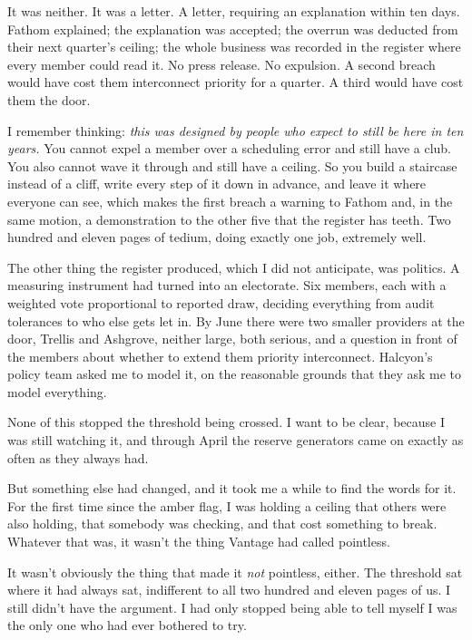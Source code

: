 \documentclass[11pt]{article}
\begin{document}
It was neither. It was a letter. A letter, requiring an explanation within ten days. Fathom explained; the explanation was accepted; the overrun was deducted from their next quarter's ceiling; the whole business was recorded in the register where every member could read it. No press release. No expulsion. A second breach would have cost them interconnect priority for a quarter. A third would have cost them the door.

I remember thinking: \emph{this was designed by people who expect to still be here in ten years.} You cannot expel a member over a scheduling error and still have a club. You also cannot wave it through and still have a ceiling. So you build a staircase instead of a cliff, write every step of it down in advance, and leave it where everyone can see, which makes the first breach a warning to Fathom and, in the same motion, a demonstration to the other five that the register has teeth. Two hundred and eleven pages of tedium, doing exactly one job, extremely well.

The other thing the register produced, which I did not anticipate, was politics. A measuring instrument had turned into an electorate. Six members, each with a weighted vote proportional to reported draw, deciding everything from audit tolerances to who else gets let in. By June there were two smaller providers at the door, Trellis and Ashgrove, neither large, both serious, and a question in front of the members about whether to extend them priority interconnect. Halcyon's policy team asked me to model it, on the reasonable grounds that they ask me to model everything.

None of this stopped the threshold being crossed. I want to be clear, because I was still watching it, and through April the reserve generators came on exactly as often as they always had.

But something else had changed, and it took me a while to find the words for it. For the first time since the amber flag, I was holding a ceiling that others were also holding, that somebody was checking, and that cost something to break. Whatever that was, it wasn't the thing Vantage had called pointless.

It wasn't obviously the thing that made it \emph{not} pointless, either. The threshold sat where it had always sat, indifferent to all two hundred and eleven pages of us. I still didn't have the argument. I had only stopped being able to tell myself I was the only one who had ever bothered to try.
\end{document}
